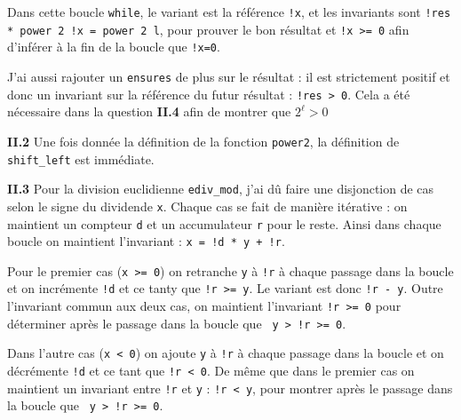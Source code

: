 \documentclass[9pt,a4paper,twocolumn]{article}
\theoremstyle{definition}
\newenvironment{code}[1][ocaml]{%
\newgeometry{textwidth = 0.8\textwidth}
\VerbatimEnvironment\begin{verbatim}%
}{%
\end{verbatim}
\restoregeometry
}
\begin{document}
Dans cette boucle \texttt{while}, le variant est la référence \texttt{!x},
et les invariants sont \texttt{!res * power 2 !x = power 2 l}, pour prouver
le bon résultat et \texttt{!x >= 0} afin d'inférer à la fin de la boucle que
\texttt{!x=0}.


J'ai aussi rajouter un \texttt{ensures} de plus sur le résultat :
il est strictement positif et donc un invariant sur la référence du futur
résultat : \texttt{!res > 0}.
Cela a été nécessaire dans la question \textbf{II.4} afin de montrer que
$2^\ell > 0$


\textbf{II.2}
Une fois donnée la définition de la fonction \texttt{power2}, la définition de
\texttt{shift\_left} est immédiate.


\textbf{II.3}
Pour la division euclidienne \texttt{ediv\_mod}, j'ai dû faire une disjonction
de cas selon le signe du dividende \texttt{x}.
Chaque cas se fait de manière itérative : on maintient un compteur \texttt{d}
et un accumulateur \texttt{r} pour le reste.
Ainsi dans chaque boucle on maintient l'invariant : \texttt{x = !d * y + !r}.

Pour le premier cas (\texttt{x >= 0}) on retranche \texttt{y} à \texttt{!r}
à chaque passage dans la boucle et on incrémente \texttt{!d} et ce tanty que
\texttt{!r >= y}.
Le variant est donc \texttt{!r - y}.
Outre l'invariant commun aux deux cas, on maintient l'invariant \texttt{!r >= 0}
pour déterminer après le passage dans la boucle que \texttt{ y > !r >= 0}.

Dans l'autre cas (\texttt{x < 0}) on ajoute \texttt{y} à \texttt{!r} à chaque
passage dans la boucle et on décrémente \texttt{!d} et ce tant que \texttt{!r < 0}.
De même que dans le premier cas on maintient un invariant entre \texttt{!r} et
\texttt{y} : \texttt{!r < y}, pour montrer après le passage dans la boucle que
\texttt{ y > !r >= 0}.
\end{document}
